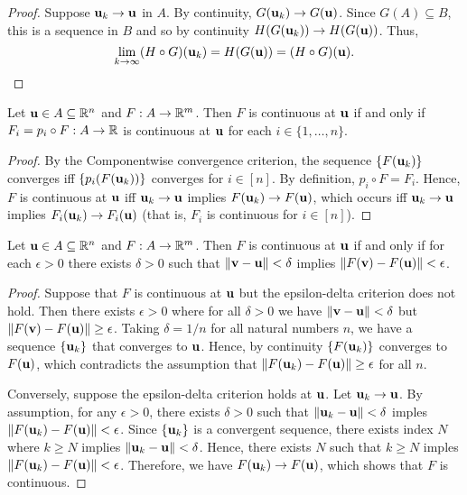 \documentclass[letterpaper, twoside, 12pt]{book}
\begin{document}
\begin{proof}
    Suppose \(\mathbf u_k \to \mathbf u\) in \(A\). By continuity, 
    \(G(\mathbf u_k) \to G(\mathbf u)\). Since \(G(A) \subseteq B\), this
    is a sequence in \(B\) and so by continuity 
    \( H(G(\mathbf u_k)) \to H(G(\mathbf u)) \). Thus, 
    \[\lim_{k \to \infty} (H \circ G)(\mathbf u_k) = H(G(\mathbf u)) = (H \circ G)(\mathbf u).\]
\end{proof}

\begin{theorem}
  Let \(\mathbf u\in A\subseteq \mathbb R^n\) and \(F:A\to\mathbb R^m\).
  Then \(F\) is continuous at \(\mathbf u\) if and only if
  \(F_i=p_i\circ F:A\to\mathbb R\) is continuous at \(\mathbf u\) for each
  \(i\in\{1,\dots,n\}\).
\end{theorem}

\begin{proof}
    By the Componentwise convergence criterion, the sequence \(\{F(\mathbf u_k)\}\)
    converges iff \(\{p_i(F(\mathbf u_k))\}\) converges for \(i \in [n]\). By 
    definition, \(p_i \circ F = F_i\). Hence, \(F\) is continuous at \(\mathbf u\)
    iff \(\mathbf u_k \to \mathbf u\) implies \(F(\mathbf u_k) \to F(\mathbf u)\), which
    occurs iff \(\mathbf u_k \to \mathbf u\) implies \(F_i(\mathbf u_k) \to F_i(\mathbf u)\)
    (that is, \(F_i\) is continuous for \(i \in [n]\)).
\end{proof}

\begin{theorem}[11.11, Exercise 12]
  Let \(\mathbf u\in A\subseteq \mathbb R^n\) and \(F:A\to\mathbb R^m\).
  Then \(F\) is continuous at \(\mathbf u\) if and only if for each
  \(\epsilon>0\) there exists \(\delta>0\) such that
  \(\|\mathbf v-\mathbf u\|<\delta\)
  implies \(\|F(\mathbf v)-F(\mathbf u)\|<\epsilon\).
\end{theorem}

\begin{proof}
    Suppose that \(F\) is continuous at \(\mathbf u\) but the epsilon-delta
    criterion does not hold. Then there exists \(\epsilon > 0\) where
    for all \(\delta > 0\) we have \(\|\mathbf v - \mathbf u\| < \delta\)
    but \(\|F(\mathbf v) - F(\mathbf u)\| \geq \epsilon\). Taking \(\delta = 1/n\) 
    for all natural numbers \(n\), we have a sequence \(\{\mathbf u_k\}\) 
    that converges to \(\mathbf u\). Hence, by continuity \(\{F(\mathbf u_k)\}\) 
    converges to \(F(\mathbf u)\), which contradicts the assumption that
    \(\|F(\mathbf u_k) - F(\mathbf u)\| \geq \epsilon\) for all \(n\).  

    Conversely, suppose the epsilon-delta criterion holds at \(\mathbf u\).
    Let \(\mathbf u_k \to \mathbf u\). By assumption, for any \(\epsilon > 0\),
    there exists \(\delta > 0\) such that \(\|\mathbf u_k - \mathbf u\| < \delta\)
    imples \(\|F(\mathbf u_k) - F(\mathbf u)\| < \epsilon\). Since \(\{\mathbf u_k\}\)
    is a convergent sequence, there exists index \(N\) where \(k \geq N\) implies
    \(\|\mathbf u_k - \mathbf u\| < \delta\). Hence, there exists \(N\) such
    that \(k \geq N\) imples \(\|F(\mathbf u_k) - F(\mathbf u)\| < \epsilon\).
    Therefore, we have \(F(\mathbf u_k) \to F(\mathbf u)\), which shows that
    \(F\) is continuous.
\end{proof}
\end{document}
